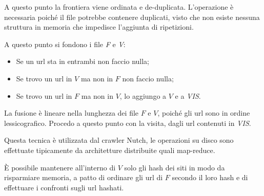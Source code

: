 A questo punto la frontiera viene ordinata e de-duplicata. 
L'operazione è necessaria poiché il file potrebbe contenere duplicati, 
visto che non esiste nessuna struttura 
in memoria che impedisce l'aggiunta di ripetizioni.

A questo punto si fondono i file \emph{F} e \emph{V}: 
\begin{itemize}
    \item Se un url sta in entrambi non faccio nulla;
    \item Se trovo un url in $V$ ma non in $F$ non faccio nulla;
    \item Se trovo un url in $F$ ma non in $V$, lo aggiungo a $V$ e 
    a \emph{VIS}.
\end{itemize}
La fusione è lineare nella lunghezza dei file $F$ e $V$, poiché gli url sono in ordine lessicografico.
Procedo a questo punto con la visita, dagli url contenuti in \emph{VIS}.
\begin{remark}
    Questa tecnica è utilizzata dal crawler Nutch, le operazioni su disco 
    sono effettuate tipicamente da architetture distribuite quali map-reduce.
\end{remark}
\begin{remark}
    È possibile mantenere all'interno di $V$ solo gli hash dei siti 
    in modo da risparmiare memoria, a patto di ordinare gli url di $F$ secondo il 
    loro hash e di effettuare i confronti sugli url hashati.
\end{remark}
